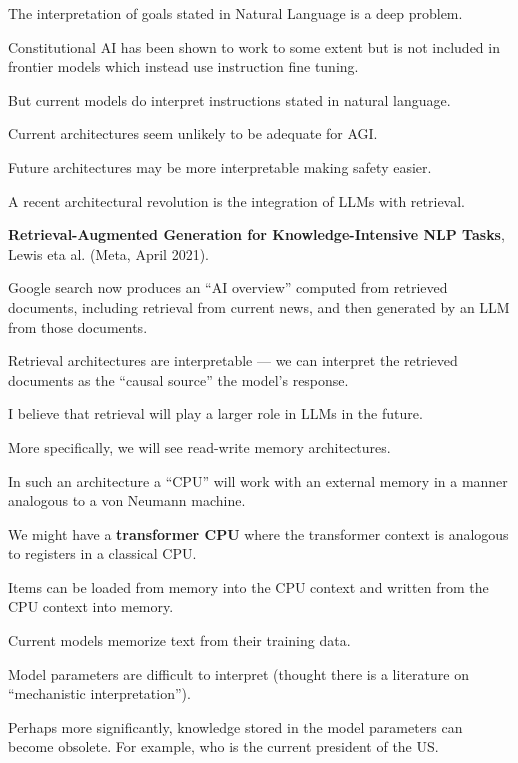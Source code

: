 {The interpretation of goals stated in Natural Language is a deep problem.

\vfill
Constitutional AI has been shown to work to some extent but is not included in frontier models which instead use instruction fine tuning.

\vfill
But current models do interpret instructions stated in natural language.


Current architectures seem unlikely to be adequate for AGI.

\vfill
Future architectures may be more interpretable making safety easier.


A recent architectural revolution is the integration of LLMs with retrieval.

\vfill
{\bf Retrieval-Augmented Generation for Knowledge-Intensive NLP Tasks}, Lewis eta al. (Meta, April 2021).

\vfill
Google search now produces an ``AI overview'' computed from retrieved documents, including retrieval from current news,
and then generated by an LLM from those documents.


\vfill
Retrieval architectures are interpretable --- we can interpret the retrieved documents as the ``causal source'' the model's response.


I believe that retrieval will play a larger role in LLMs in the future.

\vfill
More specifically, we will see read-write memory architectures.

\vfill
In such an architecture a ``CPU'' will work with an external memory in a manner analogous to a von Neumann machine.

\vfill
We might have a {\bf transformer CPU} where the transformer context is analogous to registers in a classical CPU.

\vfill
Items can be loaded from memory into the CPU context and written from the CPU context into memory.


Current models memorize text from their training data.

\vfill
Model parameters are difficult to interpret (thought there is a literature on ``mechanistic interpretation'').

\vfill
Perhaps more significantly, knowledge stored in the model parameters can become obsolete.  For example, who is the current president of the US.


}
